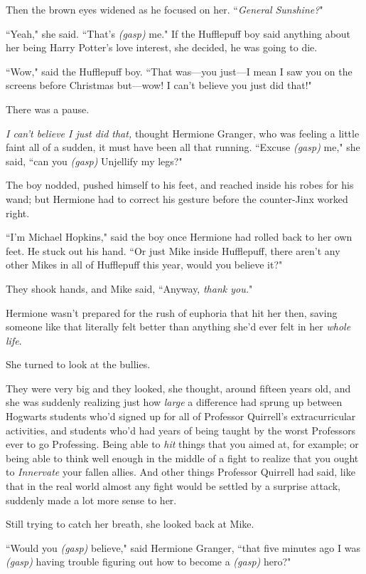 Then the brown eyes widened as he focused on her. ``\emph{General Sunshine?}"

``Yeah," she said. ``That's \emph{(gasp)} me." If the Hufflepuff boy said anything about her being Harry Potter's love interest, she decided, he was going to die.

``Wow," said the Hufflepuff boy. ``That was—you just—I mean I saw you on the screens before Christmas but—wow! I can't believe you just did that!"

There was a pause.

\emph{I can't believe I just did that,} thought Hermione Granger, who was feeling a little faint all of a sudden, it must have been all that running. ``Excuse \emph{(gasp)} me," she said, ``can you \emph{(gasp)} Unjellify my legs?"

The boy nodded, pushed himself to his feet, and reached inside his robes for his wand; but Hermione had to correct his gesture before the counter-Jinx worked right.

``I'm Michael Hopkins," said the boy once Hermione had rolled back to her own feet. He stuck out his hand. ``Or just Mike inside Hufflepuff, there aren't any other Mikes in all of Hufflepuff this year, would you believe it?"

They shook hands, and Mike said, ``Anyway, \emph{thank you.}"

Hermione wasn't prepared for the rush of euphoria that hit her then, saving someone like that literally felt better than anything she'd ever felt in her \emph{whole life}.

She turned to look at the bullies.

They were very big and they looked, she thought, around fifteen years old, and she was suddenly realizing just how \emph{large} a difference had sprung up between Hogwarts students who'd signed up for all of Professor Quirrell's extracurricular activities, and students who'd had years of being taught by the worst Professors ever to go Professing. Being able to \emph{hit} things that you aimed at, for example; or being able to think well enough in the middle of a fight to realize that you ought to \emph{Innervate} your fallen allies. And other things Professor Quirrell had said, like that in the real world almost any fight would be settled by a surprise attack, suddenly made a lot more sense to her.

Still trying to catch her breath, she looked back at Mike.

``Would you \emph{(gasp)} believe," said Hermione Granger, ``that five minutes ago I was \emph{(gasp)} having trouble figuring out how to become a \emph{(gasp)} hero?"

